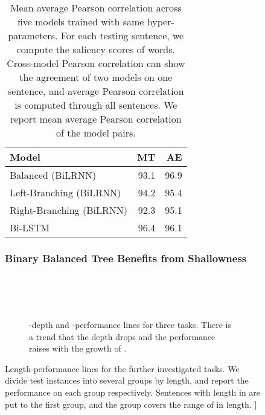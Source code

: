 \documentclass[11pt,a4paper]{article}
\begin{document}
\begin{figure}[t!]
\begin{table}[t]
    \centering
    \begin{tabular}{lrr}
         \toprule
         \textbf{Model} & \textbf{MT} & \textbf{AE} \\
         \midrule
         Balanced (BiLRNN)  & 93.1  & 96.9 \\
         Left-Branching (BiLRNN) & 94.2 & 95.4 \\
         Right-Branching (BiLRNN) & 92.3 & 95.1 \\
         Bi-LSTM            & 96.4  & 96.1 \\
         \bottomrule
    \end{tabular}
    \caption{\label{table:pearson} Mean average Pearson correlation  across five models trained with same hyper-parameters. For each testing sentence, we compute the saliency scores of words. Cross-model Pearson correlation can show the agreement of two models on one sentence, and average Pearson correlation is computed through all sentences. We report mean average Pearson correlation of the  model pairs. }
\end{table}

\subsubsection{Binary Balanced Tree Benefits from Shallowness}
\label{sec:balanced-better}
\begin{figure}[t!]
    \centering
    ~~
    \\
    ~~
    \\
    ~~
    \caption{\label{fig:tree-depth-performance} -depth and -performance lines for three tasks. 
    There is a trend that the depth drops and the performance raises with the growth of . }
\end{figure}   

\begin{figure*}[t!]
    \centering
    \caption{\label{fig:length-performance} Length-performance lines for the further investigated tasks. We divide test instances into several groups by length, and report the performance on each group respectively. Sentences with length in  are put to the first group, and the group  covers the range of  in length. ]}
\end{figure*}


\end{figure}
\end{document}
